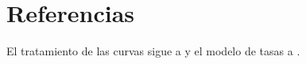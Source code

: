 
\section{Referencias}\label{sec:capNN-referencias}

El tratamiento de las curvas sigue a \citet{hagan2006} y el modelo de tasas a \citet{brigo2006}.
